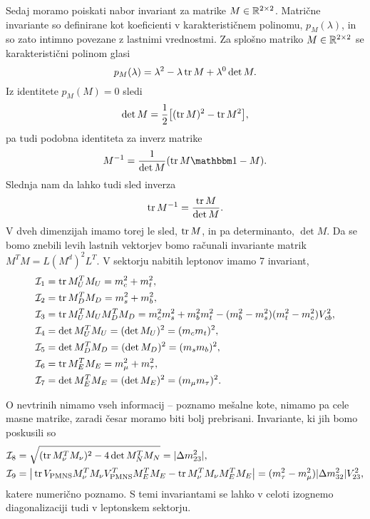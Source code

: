 Sedaj moramo poiskati nabor invariant za matrike $M \in \mathbb{R}^{2\times 2}$. Matrične invariante so
definirane kot koeficienti v karakterističnem polinomu, $p_M(\lambda)$, in so zato intimno povezane
z lastnimi vrednostmi. Za splošno matriko $M \in \mathbb{R}^{2\times 2}$ se karakteristični polinom glasi
\begin{equation}
	p_M(\lambda) = \lambda^2 - \lambda \operatorname{tr} M + \lambda^0 \det M.
\end{equation}
Iz identitete $p_M(M) = 0$ sledi
\begin{equation}
	\det M = \frac{1}{2}\big[(\operatorname{tr} M)^2 - \operatorname{tr} M^2\big],
\end{equation}
pa tudi podobna identiteta za inverz matrike
\begin{equation}
	M^{-1} = \frac{1}{\det M}(\tr M \one - M).
\end{equation}
Slednja nam da lahko tudi sled inverza
\begin{equation}
	\operatorname{tr} M^{-1} = \frac{\operatorname{tr} M}{\det M}.
\end{equation}
V dveh dimenzijah imamo torej le sled, $\operatorname{tr} M$, in pa determinanto, $\det M$. Da se bomo znebili
levih lastnih vektorjev bomo računali invariante matrik $M^T M = L (M^d)^2 L^T$. V sektorju nabitih
leptonov imamo 7 invariant,
\begin{align}
	\mathcal{I}_1 &= \operatorname{tr} M_U^T M_U = m_c^2 + m_t^2, \notag \\
	\mathcal{I}_2 &= \operatorname{tr} M_D^T M_D = m_s^2 + m_b^2, \notag \\
	\mathcal{I}_3 &= \operatorname{tr} M_U^T M_U M_D^T M_D = m_c^2m_s^2 + m_b^2m_t^2 -
		(m_b^2 - m_s^2)(m_t^2 - m_c^2)V_{cb}^2, \notag \\
	\mathcal{I}_4 &= \det M_U^T M_U = (\det M_U)^2 = (m_c m_t)^2, \notag \\
	\mathcal{I}_5 &= \det M_D^T M_D = (\det M_D)^2 = (m_s m_b)^2, \notag \\
	\mathcal{I}_6 &= \operatorname{tr} M_E^T M_E = m_\mu^2 + m_\tau^2, \notag \\
	\mathcal{I}_7 &= \det M_E^T M_E = (\det M_E)^2 = (m_\mu m_\tau)^2.
\end{align}

\noindent O nevtrinih nimamo vseh informacij -- poznamo mešalne kote, nimamo pa cele masne matrike,
zaradi česar moramo biti bolj prebrisani. Invariante, ki jih bomo poskusili so
\begin{align}
	\mathcal{I}_8 &= \sqrt{(\operatorname{tr} M_\nu^T M_\nu)^2 - 4\det M_N^T M_N} = |\Delta m_{23}^2|, \\
	\mathcal{I}_9 &= \big|\operatorname{tr} V_\text{PMNS} M_\nu^T M_\nu V_\text{PMNS}^T M_E^T M_E
		- \operatorname{tr} M_\nu^T M_\nu M_E^T M_E\big| = (m_\tau^2 - m_\mu^2)|\Delta m_{32}^2| V_{23}^2,
\end{align}
katere numerično poznamo. S temi invariantami se lahko v celoti izognemo diagonalizaciji tudi
v leptonskem sektorju.

